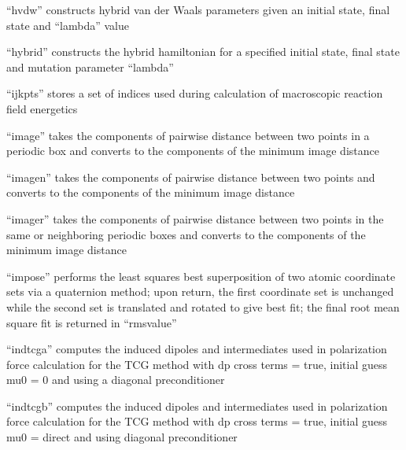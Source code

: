 \documentclass[letterpaper,11pt,english]{sphinxmanual}
\begin{document}

“hvdw” constructs hybrid van der Waals  parameters given
an initial state, final state and “lambda” value


“hybrid” constructs the hybrid hamiltonian for a specified
initial state, final state and mutation parameter “lambda”


“ijkpts” stores a set of indices used during calculation
of macroscopic reaction field energetics


“image” takes the components of pairwise distance between
two points in a periodic box and converts to the components
of the minimum image distance


“imagen” takes the components of pairwise distance between
two points and converts to the components of the minimum
image distance


“imager” takes the components of pairwise distance between
two points in the same or neighboring periodic boxes and
converts to the components of the minimum image distance


“impose” performs the least squares best superposition
of two atomic coordinate sets via a quaternion method;
upon return, the first coordinate set is unchanged while
the second set is translated and rotated to give best fit;
the final root mean square fit is returned in “rmsvalue”


“indtcga” computes the induced dipoles and intermediates used
in polarization force calculation for the TCG method with dp
cross terms = true, initial guess mu0 = 0 and using a diagonal
preconditioner


“indtcgb” computes the induced dipoles and intermediates used
in polarization force calculation for the TCG method with dp
cross terms = true, initial guess mu0 = direct and using diagonal
preconditioner

\end{document}
